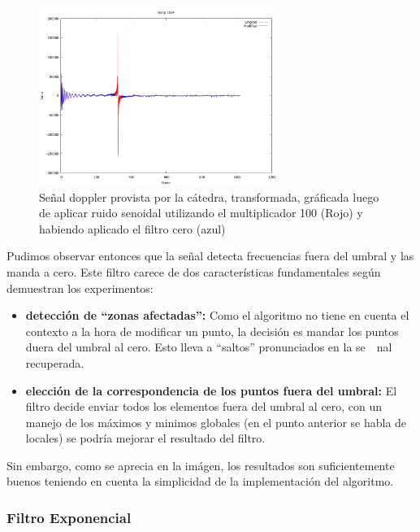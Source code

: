 \begin{figure}
\begin {center}
\includegraphics[width=220pt]{../matlab/dopp1024-sin100-zero-spec.png}
\end {center}
\caption{Se\~nal doppler provista por la c\'atedra, transformada, gr\'aficada
luego de aplicar ruido senoidal utilizando el multiplicador 100 (Rojo) y 
habiendo aplicado el filtro cero (azul)}
\label{fig:SinProm}
\end{figure}

Pudimos observar entonces que la se\~nal detecta frecuencias fuera del umbral y
las manda a cero. Este filtro carece de dos caracter\'isticas fundamentales
seg\'un demuestran los experimentos:

\begin{itemize}
	\item {\bf detecci\'on de ``zonas afectadas'':} Como el algoritmo no tiene en
cuenta el contexto a la hora de modificar un punto, la decisi\'on es mandar los
puntos duera del umbral al cero. Esto lleva a ``saltos'' pronunciados en la se\
~nal recuperada.

	\item {\bf elecci\'on de la correspondencia de los puntos fuera del umbral:}
El filtro decide enviar todos los elementos fuera del umbral al cero, con un
manejo de los m\'aximos y minimos globales (en el punto anterior se habla de
locales) se podr\'ia mejorar el resultado del filtro.
\end{itemize}

Sin embargo, como se aprecia en la im\'agen, los resultados son suficientemente
buenos teniendo en cuenta la simplicidad de la implementaci\'on del algoritmo.

\subsubsection{Filtro Exponencial}

